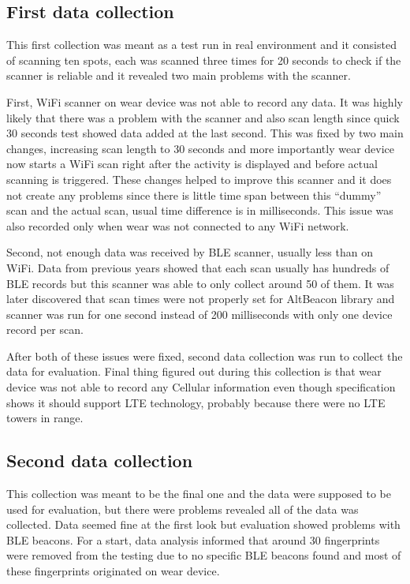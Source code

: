 \subsection{First data collection}\label{sec:FirstDataCollection}
This first collection was meant as a test run in real environment and it consisted of scanning ten spots, each was scanned three times for 20 seconds to check if the scanner is reliable and it revealed two main problems with the scanner.

First, WiFi scanner on wear device was not able to record any data. It was highly likely that there was a problem with the scanner and also scan length since quick 30 seconds test showed data added at the last second. This was fixed by two main changes, increasing scan length to 30 seconds and more importantly wear device now starts a WiFi scan right after the activity is displayed and before actual scanning is triggered. These changes helped to improve this scanner and it does not create any problems since there is little time span between this \enquote{dummy} scan and the actual scan, usual time difference is in milliseconds. This issue was also recorded only when wear was not connected to any WiFi network.

Second, not enough data was received by BLE scanner, usually less than on WiFi. Data from previous years showed that each scan usually has hundreds of BLE records but this scanner was able to only collect around 50 of them. It was later discovered that scan times were not properly set for AltBeacon library and scanner was run for one second instead of 200 milliseconds with only one device record per scan.

After both of these issues were fixed, second data collection was run to collect the data for evaluation. Final thing figured out during this collection is that wear device was not able to record any Cellular information even though specification shows it should support LTE technology, probably because there were no LTE towers in range. 

\subsection{Second data collection}\label{sec:SecondDataCollection}
This collection was meant to be the final one and the data were supposed to be used for evaluation, but there were problems revealed all of the data was collected. Data seemed fine at the first look but evaluation showed problems with BLE beacons. For a start, data analysis informed that around 30 fingerprints were removed from the testing due to no specific BLE beacons found and most of these fingerprints originated on wear device.

